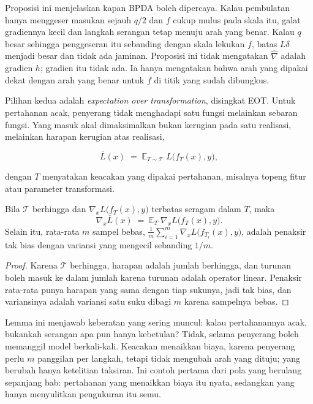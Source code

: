 Proposisi ini menjelaskan kapan BPDA boleh dipercaya. Kalau pembulatan hanya menggeser
masukan sejauh $q/2$ dan $f$ cukup mulus pada skala itu, galat gradiennya kecil dan
langkah serangan tetap menuju arah yang benar. Kalau $q$ besar sehingga penggeseran itu
sebanding dengan skala lekukan $f$, batas $L\delta$ menjadi besar dan tidak ada jaminan.
Proposisi ini tidak mengatakan $\widehat{\nabla}$ adalah gradien $h$; gradien itu tidak
ada. Ia hanya mengatakan bahwa arah yang dipakai dekat dengan arah yang benar untuk $f$
di titik yang sudah dibungkus.

Pilihan kedua adalah \emph{expectation over transformation}, disingkat EOT. Untuk
pertahanan acak, penyerang tidak menghadapi satu fungsi melainkan sebaran fungsi.
Yang masuk akal dimaksimalkan bukan kerugian pada satu realisasi, melainkan harapan
kerugian atas realisasi,

\begin{equation}
\overline{L}(x) \;=\; \mathbb{E}_{T\sim\mathcal{T}}\; L\bigl(f_T(x),y\bigr),
\end{equation}

dengan $T$ menyatakan keacakan yang dipakai pertahanan, misalnya topeng fitur atau
parameter transformasi.

\begin{lemma}
Bila $\mathcal{T}$ berhingga dan $\nabla_x L\bigl(f_T(x),y\bigr)$ terbatas seragam
dalam $T$, maka
\begin{equation}
\nabla_x \overline{L}(x) \;=\; \mathbb{E}_{T}\;\nabla_x L\bigl(f_T(x),y\bigr).
\end{equation}
Selain itu, rata-rata $m$ sampel bebas,
$\frac{1}{m}\sum_{i=1}^{m}\nabla_x L\bigl(f_{T_i}(x),y\bigr)$, adalah penaksir tak bias
dengan variansi yang mengecil sebanding $1/m$.
\end{lemma}

\begin{proof}
Karena $\mathcal{T}$ berhingga, harapan adalah jumlah berhingga, dan turunan boleh
masuk ke dalam jumlah karena turunan adalah operator linear. Penaksir rata-rata punya
harapan yang sama dengan tiap sukunya, jadi tak bias, dan variansinya adalah variansi
satu suku dibagi $m$ karena sampelnya bebas.
\end{proof}

Lemma ini menjawab keberatan yang sering muncul: kalau pertahanannya acak, bukankah
serangan apa pun hanya kebetulan? Tidak, selama penyerang boleh memanggil model
berkali-kali. Keacakan menaikkan biaya, karena penyerang perlu $m$ panggilan per langkah,
tetapi tidak mengubah arah yang dituju; yang berubah hanya ketelitian taksiran. Ini
contoh pertama dari pola yang berulang sepanjang bab: pertahanan yang menaikkan biaya itu
nyata, sedangkan yang hanya menyulitkan pengukuran itu semu.

